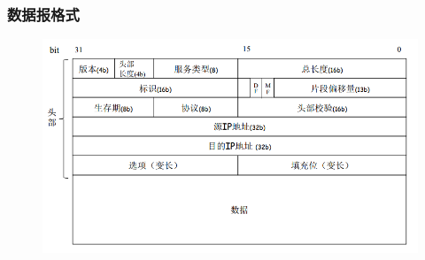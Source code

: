 \subsubsection{数据报格式}
\begin{figure}[H]
	\centering
	\includegraphics[width=0.7\linewidth]{fig/IP_datagram.png}
\end{figure}
